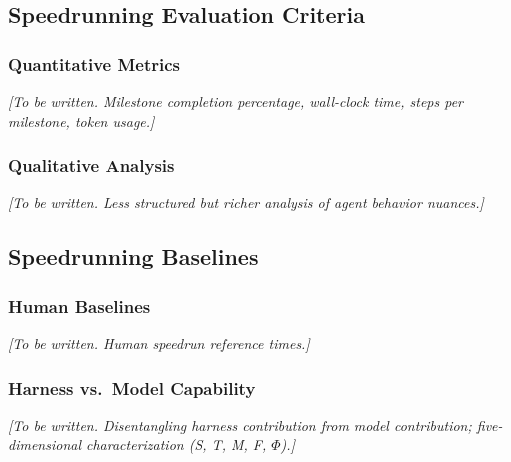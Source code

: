 \subsection{Speedrunning Evaluation Criteria}\label{sec:evaluation_criteria}

\subsubsection{Quantitative Metrics}\label{sec:quantitative_metrics}

\textit{[To be written. Milestone completion percentage, wall-clock time, steps per milestone, token usage.]}

\subsubsection{Qualitative Analysis}\label{sec:qualitative_analysis}

\textit{[To be written. Less structured but richer analysis of agent behavior nuances.]}

\subsection{Speedrunning Baselines}\label{sec:baselines}

\subsubsection{Human Baselines}\label{sec:human_baselines}

\textit{[To be written. Human speedrun reference times.]}

\subsubsection{Harness vs.\ Model Capability}\label{sec:harness_vs_model}

\textit{[To be written. Disentangling harness contribution from model contribution; five-dimensional characterization (S, T, M, F, $\Phi$).]}
